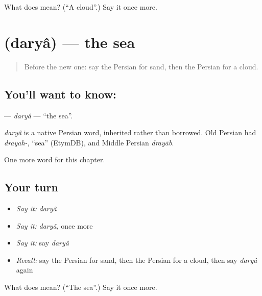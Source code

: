 \begin{tcolorbox}[breakable,colback=teal!4,colframe=teal!35!black,title={Before you move on}]
What does  mean? (\textquotedblleft{}A cloud\textquotedblright{}.) Say it once more.
\end{tcolorbox}
\section[\texorpdfstring{\fa{دریا} (daryâ)}{دریا (daryâ)}]{ (daryâ) — the sea}

\label{lesson:FA-C53-darya}



\begin{quote}
Before the new one: say the Persian for sand, then the Persian for a cloud.
\end{quote}

\subsection*{You'll want to know: }
\textbf{} — \emph{daryâ} — \textquotedblleft{}the sea\textquotedblright{}.

\begin{cousinweb}
\emph{daryâ} is a native Persian word, inherited rather than borrowed. Old Persian had \emph{drayah-}, \textquotedblleft{}sea\textquotedblright{} (EtymDB), and Middle Persian \emph{drayāb}.
\end{cousinweb}

\begin{grammarlens}[title={What you've built}]
One more word for this chapter.
\end{grammarlens}

\subsection*{Your turn}
\begin{itemize}
\raggedright
  \item \emph{Say it:} \emph{daryâ}
  \item \emph{Say it:} \emph{daryâ}, once more
  \item \emph{Say it:} say \emph{daryâ}
  \item \emph{Recall:} say the Persian for sand, then the Persian for a cloud, then say \emph{daryâ} again
\end{itemize}

\begin{tcolorbox}[breakable,colback=teal!4,colframe=teal!35!black,title={Before you move on}]
What does  mean? (\textquotedblleft{}The sea\textquotedblright{}.) Say it once more.
\end{tcolorbox}
